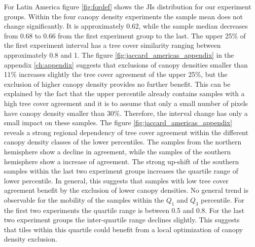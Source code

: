 			For Latin America figure \ref{fig:fordef} shows the \acp{JI} distribution for our experiment groups. Within the four canopy density experiments the sample mean does not change significantly. It is approximately 0.62, while the sample median decreases from 0.68 to 0.66 from the first experiment group to the last. The upper 25\% of the first experiment interval has a tree cover similarity ranging between approximately 0.8 and 1. The figure \ref{fig:jaccard_americas_appendix} in the appendix \ref{ch:appendix} suggests that exclusions of canopy densities smaller than 11\% increases slightly the tree cover agreement of the upper 25\%, but the exclusion of higher canopy density provides no further benefit. This can be explained by the fact that the upper percentile already contains samples with a high tree cover agreement and it is to assume that only a small number of pixels have canopy density smaller than 30\%. Therefore, the interval change has only a small impact on these samples. The figure \ref{fig:jaccard_americas_appendix} reveals a strong regional dependency of tree cover agreement within the different canopy density classes of the lower percentiles. The samples from the northern hemisphere show a decline in agreement, while the samples of the southern hemisphere show a increase of agreement. The strong up-shift of the southern samples within the last two experiment groups increases the quartile range of lower percentile. In general, this suggests that samples with low tree cover agreement benefit by the exclusion of lower canopy densities. No general trend is observable for the mobility of the samples within the $Q_1$ and $Q_3$ percentile. For the first two experiments the quartile range is between 0.5 and 0.8. For the last two experiment groups the inter-quartile range declines slightly. This suggests that tiles within this quartile could benefit from a local optimization of canopy density exclusion.

